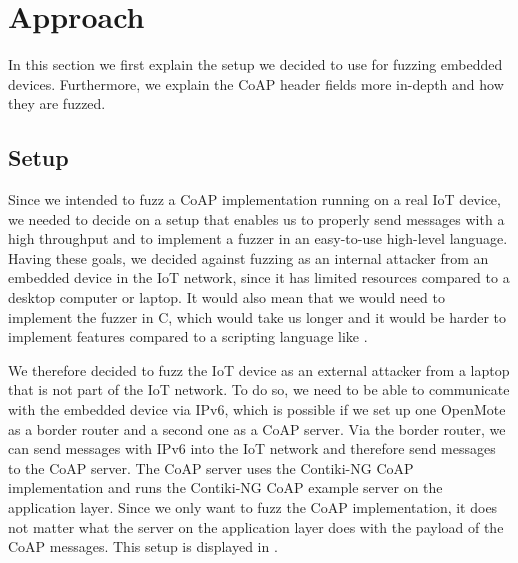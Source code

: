 \section{Approach}
\label{section:approach}


In this section we first explain the setup we decided to use for fuzzing embedded devices. Furthermore, we explain the CoAP header fields more in-depth and how they are fuzzed.

\subsection{Setup}
Since we intended to fuzz a CoAP implementation running on a real IoT device, we needed to decide on a setup that enables us to properly send messages with a high throughput and to implement a fuzzer in an easy-to-use high-level language. Having these goals, we decided against fuzzing as an internal attacker from an embedded device in the IoT network, since it has limited resources compared to a desktop computer or laptop. It would also mean that we would need to implement the fuzzer in C, which would take us longer and it would be harder to implement features compared to a scripting language like \python.

We therefore decided to fuzz the IoT device as an external attacker from a laptop that is not part of the IoT network. To do so, we need to be able to communicate with the embedded device via IPv6, which is possible if we set up one OpenMote as a border router and a second one as a CoAP server. Via the border router, we can send messages with IPv6 into the IoT network and therefore send messages to the CoAP server. The CoAP server uses the Contiki-NG CoAP implementation and runs the Contiki-NG CoAP example server on the application layer. Since we only want to fuzz the CoAP implementation, it does not matter what the server on the application layer does with the payload of the CoAP messages. This setup is displayed in .

